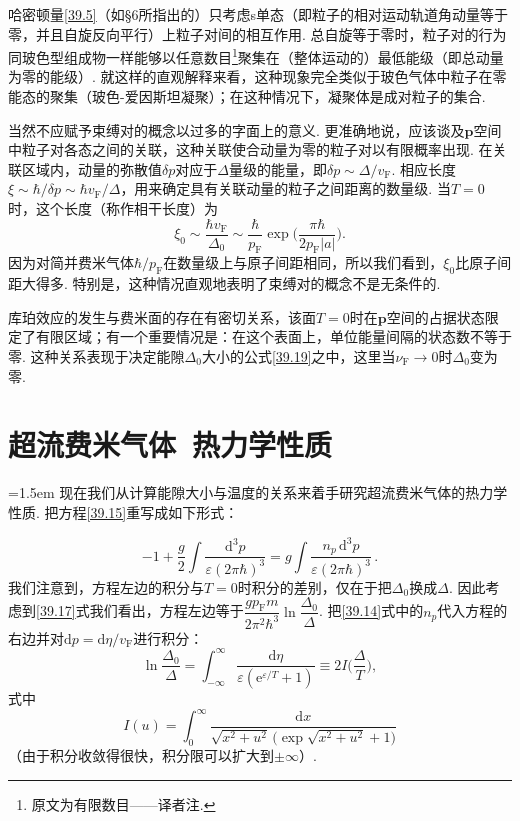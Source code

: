 哈密顿量\eqref{39.5}（如§6所指出的）只考虑s单态（即粒子的相对运动轨道角动量等于零，并且自旋反向平行）上粒子对间的相互作用. 总自旋等于零时，粒子对的行为同玻色型组成物一样能够以任意数目\footnote{原文为有限数目——译者注.}聚集在（整体运动的）最低能级（即总动量为零的能级）. 就这样的直观解释来看，这种现象完全类似于玻色气体中粒子在零能态的聚集（玻色-爱因斯坦凝聚）；在这种情况下，凝聚体是成对粒子的集合.

当然不应赋予束缚对的概念以过多的字面上的意义. 更准确地说，应该谈及$\bm p$空间中粒子对各态之间的关联，这种关联使合动量为零的粒子对以有限概率出现. 在关联区域内，动量的弥散值$\delta p$对应于$\Delta$量级的能量，即$\delta p\sim\Delta/v_{\mathrm F}$. 相应长度$\xi\sim\hbar/\delta p\sim\hbar v_{\mathrm F}/\Delta$，用来确定具有关联动量的粒子之间距离的数量级. 当$T=0$时，这个长度（称作相干长度）为
\begin{equation}
\xi_0\sim\frac{\hbar v_{\mathrm F}}{\Delta_0}\sim\frac{\hbar}{p_{\mathrm F}}\exp\Biggl(\frac{\pi\hbar}{2p_{\mathrm F}|a|}\Biggr).
\label{39.21}
\end{equation}
因为对简并费米气体$\hbar/p_{\mathrm F}$在数量级上与原子间距相同，所以我们看到，$\xi_0$比原子间距大得多. 特别是，这种情况直观地表明了束缚对的概念不是无条件的.

库珀效应的发生与费米面的存在有密切关系，该面$T=0$时在$\bm p$空间的占据状态限定了有限区域；有一个重要情况是：在这个表面上，单位能量间隔的状态数不等于零. 这种关系表现于决定能隙$\Delta_0$大小的公式\eqref{39.19}之中，这里当$\nu_{\mathrm F}\to0$时$\Delta_0$变为零.

\section{超流费米气体\ 热力学性质}

{\emergencystretch=1.5em 现在我们从计算能隙大小与温度的关系来着手研究超流费米气体的热力学性质. 把方程\eqref{39.15}重写成如下形式：\par}
\begin{equation*}
-1 + \frac{g}{2}\int\frac{\mathrm d^3p}{\varepsilon(2\pi\hbar)^3} = g\int\frac{n_p\,\mathrm d^3p}{\varepsilon(2\pi\hbar)^3}\,.
\end{equation*}
我们注意到，方程左边的积分与$T=0$时积分的差别，仅在于把$\Delta_0$换成$\Delta$. 因此考虑到\eqref{39.17}式我们看出，方程左边等于$\dfrac{gp_{\mathrm F}m}{2\pi^2\hbar^3}\ln\dfrac{\Delta_0}{\Delta}$. 把\eqref{39.14}式中的$n_p$代入方程的右边并对$\mathrm dp=\mathrm d\eta/v_{\mathrm F}$进行积分：
\begin{equation}
\ln\frac{\Delta_0}{\Delta} = \int_{-\infty}^{\infty}\frac{\mathrm d\eta}{\varepsilon(\mathrm e^{\varepsilon/T}+1)} \equiv 2I\Biggl(\frac{\Delta}{T}\Biggr),
\label{40.1}
\end{equation}
式中
\begin{equation*}
I(u) = \int_0^{\infty}\frac{\mathrm dx}{\sqrt{x^2+u^2}\,\bigl(\exp\sqrt{x^2+u^2}+1\bigr)}
\end{equation*}
（由于积分收敛得很快，积分限可以扩大到$\pm\infty$）.

